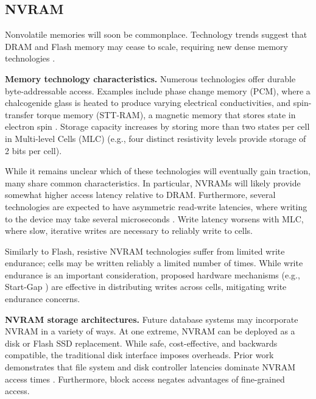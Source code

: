 \subsection{NVRAM}
\label{sec:Background:Storage:NVRAM}

Nonvolatile memories will soon be commonplace.
Technology trends suggest that DRAM and Flash memory may cease to scale, requiring new dense memory technologies \cite{LeeIpek09}.

\textbf{Memory technology characteristics.}
Numerous technologies offer durable byte-addressable access.
Examples include phase change memory (PCM), where a chalcogenide glass is heated to produce varying electrical conductivities, and spin-transfer torque memory (STT-RAM), a magnetic memory that stores state in electron spin \cite{BurrKurdi08}.
Storage capacity increases by storing more than two states per cell in Multi-level Cells (MLC) (e.g., four distinct resistivity levels provide storage of 2 bits per cell).

While it remains unclear which of these technologies will eventually gain traction, many share common characteristics.
In particular, NVRAMs will likely provide somewhat higher access latency relative to DRAM.
Furthermore, several technologies are expected to have asymmetric read-write latencies, where writing to the device may take several microseconds \cite{QureshiSrinivasan09}.
Write latency worsens with MLC, where slow, iterative writes are necessary to reliably write to cells.

Similarly to Flash, resistive NVRAM technologies suffer from limited write endurance; cells may be written reliably a limited number of times.
While write endurance is an important consideration, proposed hardware mechanisms (e.g., Start-Gap \cite{QureshiKaridis09}) are effective in distributing writes across cells, mitigating write endurance concerns.

\textbf{NVRAM storage architectures.}
Future database systems may incorporate NVRAM in a variety of ways.
At one extreme, NVRAM can be deployed as a disk or Flash SSD replacement.
While safe, cost-effective, and backwards compatible, the traditional disk interface imposes overheads.
Prior work demonstrates that file system and disk controller latencies dominate NVRAM access times \cite{CaulfieldDe10}.
Furthermore, block access negates advantages of fine-grained access.

